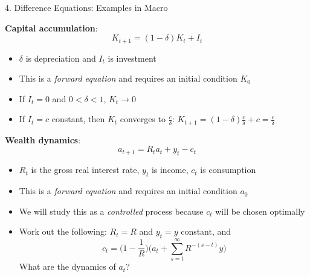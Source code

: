 \documentclass[10pt]{beamer}
\begin{document}
\begin{frame}{4. Difference Equations: Examples in Macro}

\textbf{Capital accumulation}:
\begin{equation*}
	K_{t+1} = (1 - \delta) K_t + I_t
\end{equation*}
\begin{itemize}
\item $\delta$ is depreciation and $I_t$ is investment

\item This is a \textit{forward equation} and requires an initial condition $K_0$

\item If $I_t = 0$ and $0 < \delta < 1$, $K_t \to 0$

\item If $I_t = c$ constant, then $K_t$ converges to $\frac{c}{\delta}$: $K_{t+1} = (1-\delta) \frac{c}{\delta} + c = \frac{c}{\delta}$
\end{itemize}
\end{frame}


\begin{frame}{}
\textbf{Wealth dynamics}:
\begin{equation*}
	a_{t+1} = R_t a_t + y_t - c_t
\end{equation*}
\begin{itemize}
	\item $R_t$ is the gross real interest rate, $y_t$ is income, $c_t$ is consumption
	
	\item This is a \textit{forward equation} and requires an initial condition $a_0$
	
	\item We will study this as a \textit{controlled} process because $c_t$ will be chosen optimally
	
	\item Work out the following: $R_t = R$ and $y_t = y$ constant, and  
	\begin{equation*}
		c_t = \bigg( 1 - \frac{1}{R} \bigg) \bigg(a_t + \sum_{s=t}^\infty R^{-(s-t)} y \bigg)
	\end{equation*}
	What are the dynamics of $a_t$?
\end{itemize}
\end{frame}
\end{document}
